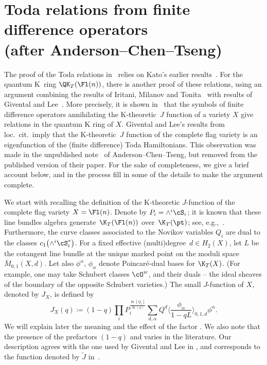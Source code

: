 \appendix

\section[Toda relations from finite difference operators (after Anderson--Chen--Tseng)]{Toda relations from finite difference operators\\ (after Anderson--Chen--Tseng)}\label{sec:toda}

The proof of the Toda relations in~\cite{maeno.naito.sagaki:QKideal}
relies on Kato's earlier results~\cite{kato:loop}. For the quantum K~ring
$\QK_T(\Fl(n))$, there is another proof of these relations, using an argument
combining the results of Iritani, Milanov and
Tonita~\cite{Iritani:2013qka} with results of Givental
and Lee~\cite{givental_lee}. More precisely, it is shown in~\cite{Iritani:2013qka} that
the symbols of finite
difference operators annihilating the K-theoretic~$J$ function of a variety $X$ give relations in the quantum K ring of $X$. Givental and Lee's results from loc.\ cit.\ imply that the
K-theoretic~$J$ function of the complete flag variety is an eigenfunction of the
(finite difference) Toda Hamiltonians. This observation was made in the unpublished note~\cite{act:2017} of Anderson--Chen--Tseng, but removed from the published version of their paper. For the sake of completeness, we give a brief account below, and in the process fill in some of the details to make the argument complete.

We start with recalling the definition
of the K-theoretic $J$-function of the complete flag variety $X=\Fl(n)$.
Denote by $P_i= \wedge^i \cS_i$; it is known that these line bundles algebra generate~$\K_T(\Fl(n))$
over~$\K_T(\pt)$; see, e.g.,~\cite[Proposition~3.1]{GMSXZZ:Nakayama}. Furthermore,
the curve classes associated to the Novikov variables
$Q_i$ are dual to the classes
$c_1\bigl(\wedge^i \cS_i^*\bigr)$.
For a fixed effective (multi)degree~${d \in H_2(X)}$, let $L$ be the cotangent line bundle at the unique marked point on the moduli space $\overline{M}_{0,1}(X,d)$.
Let also $\phi^\alpha$, $\phi_\alpha$ denote Poincar\'e-dual bases for $\K_T(X)$. (For example,
one may take Schubert classes $\cO^w$, and their duals -- the ideal sheaves of the boundary of the opposite Schubert varieties.)
The small $J$-function of $X$, denoted by $J_X$, is defined by
\[
J_X(q)\coloneq (1-q)\prod_i P_i^{\frac{\ln(Q_i)}{\ln(q)}}\sum_{d,\alpha} Q^d\biggl\langle \frac{\phi_\alpha}{1-qL}\biggr\rangle_{0,1,d}\phi^\alpha .
\]
We will explain later the meaning and the effect of the factor
. We also note that the presence
of the prefactors $(1-q)$
and  varies in the literature.
Our description agrees with the one used by Givental and Lee in
\cite{givental_lee}, and corresponds to the function denoted by $\tilde{J}$ in~\cite{Iritani:2013qka}.

